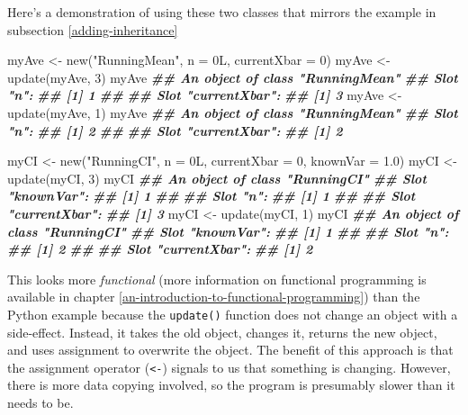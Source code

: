 \documentclass[
  12pt,
  krantz2]{krantz}
\makeatletter
\newenvironment{Shaded}{\begin{snugshade}}{\end{snugshade}}
\newcommand{\AttributeTok}[1]{\textcolor[rgb]{0.61,0.61,0.61}{#1}}
\newcommand{\DecValTok}[1]{\textcolor[rgb]{0.06,0.06,0.06}{#1}}
\newcommand{\DocumentationTok}[1]{\textcolor[rgb]{0.37,0.37,0.37}{\textbf{\textit{#1}}}}
\newcommand{\FloatTok}[1]{\textcolor[rgb]{0.06,0.06,0.06}{#1}}
\newcommand{\FunctionTok}[1]{\textcolor[rgb]{0,0,0}{#1}}
\newcommand{\NormalTok}[1]{#1}
\newcommand{\OtherTok}[1]{\textcolor[rgb]{0.37,0.37,0.37}{#1}}
\newcommand{\StringTok}[1]{\textcolor[rgb]{0.5,0.5,0.5}{#1}}
\newenvironment{kframe}{%
\medskip{}
\setlength{\fboxsep}{.8em}
 \def\at@end@of@kframe{}%
 \ifinner\ifhmode%
  \def\at@end@of@kframe{\end{minipage}}%
  \begin{minipage}{\columnwidth}%
 \fi\fi%
 \def\FrameCommand##1{\hskip\@totalleftmargin \hskip-\fboxsep
 \colorbox{shadecolor}{##1}\hskip-\fboxsep
     \hskip-\linewidth \hskip-\@totalleftmargin \hskip\columnwidth}%
 \MakeFramed {\advance\hsize-\width
   \@totalleftmargin\z@ \linewidth\hsize
   \@setminipage}}%
 {\par\unskip\endMakeFramed%
 \at@end@of@kframe}
\renewenvironment{Shaded}{\begin{kframe}}{\end{kframe}}
\makeatother
\begin{document}
Here's a demonstration of using these two classes that mirrors the example in subsection \ref{adding-inheritance}

\begin{Shaded}
\begin{Highlighting}[]
\NormalTok{myAve }\OtherTok{\textless{}{-}} \FunctionTok{new}\NormalTok{(}\StringTok{"RunningMean"}\NormalTok{, }\AttributeTok{n =}\NormalTok{ 0L, }\AttributeTok{currentXbar =} \DecValTok{0}\NormalTok{)}
\NormalTok{myAve }\OtherTok{\textless{}{-}} \FunctionTok{update}\NormalTok{(myAve, }\DecValTok{3}\NormalTok{)}
\NormalTok{myAve}
\DocumentationTok{\#\# An object of class "RunningMean"}
\DocumentationTok{\#\# Slot "n":}
\DocumentationTok{\#\# [1] 1}
\DocumentationTok{\#\# }
\DocumentationTok{\#\# Slot "currentXbar":}
\DocumentationTok{\#\# [1] 3}
\NormalTok{myAve }\OtherTok{\textless{}{-}} \FunctionTok{update}\NormalTok{(myAve, }\DecValTok{1}\NormalTok{)}
\NormalTok{myAve}
\DocumentationTok{\#\# An object of class "RunningMean"}
\DocumentationTok{\#\# Slot "n":}
\DocumentationTok{\#\# [1] 2}
\DocumentationTok{\#\# }
\DocumentationTok{\#\# Slot "currentXbar":}
\DocumentationTok{\#\# [1] 2}

\NormalTok{myCI }\OtherTok{\textless{}{-}} \FunctionTok{new}\NormalTok{(}\StringTok{"RunningCI"}\NormalTok{, }\AttributeTok{n =}\NormalTok{ 0L, }\AttributeTok{currentXbar =} \DecValTok{0}\NormalTok{, }\AttributeTok{knownVar =} \FloatTok{1.0}\NormalTok{)}
\NormalTok{myCI }\OtherTok{\textless{}{-}} \FunctionTok{update}\NormalTok{(myCI, }\DecValTok{3}\NormalTok{)}
\NormalTok{myCI}
\DocumentationTok{\#\# An object of class "RunningCI"}
\DocumentationTok{\#\# Slot "knownVar":}
\DocumentationTok{\#\# [1] 1}
\DocumentationTok{\#\# }
\DocumentationTok{\#\# Slot "n":}
\DocumentationTok{\#\# [1] 1}
\DocumentationTok{\#\# }
\DocumentationTok{\#\# Slot "currentXbar":}
\DocumentationTok{\#\# [1] 3}
\NormalTok{myCI }\OtherTok{\textless{}{-}} \FunctionTok{update}\NormalTok{(myCI, }\DecValTok{1}\NormalTok{)}
\NormalTok{myCI}
\DocumentationTok{\#\# An object of class "RunningCI"}
\DocumentationTok{\#\# Slot "knownVar":}
\DocumentationTok{\#\# [1] 1}
\DocumentationTok{\#\# }
\DocumentationTok{\#\# Slot "n":}
\DocumentationTok{\#\# [1] 2}
\DocumentationTok{\#\# }
\DocumentationTok{\#\# Slot "currentXbar":}
\DocumentationTok{\#\# [1] 2}
\end{Highlighting}
\end{Shaded}

This looks more \emph{functional} (more information on functional programming is available in chapter \ref{an-introduction-to-functional-programming}) than the Python example because the \texttt{update()} function does not change an object with a side-effect. Instead, it takes the old object, changes it, returns the new object, and uses assignment to overwrite the object. The benefit of this approach is that the assignment operator (\texttt{\textless{}-})  signals to us that something is changing. However, there is more data copying involved, so the program is presumably slower than it needs to be.
\end{document}
